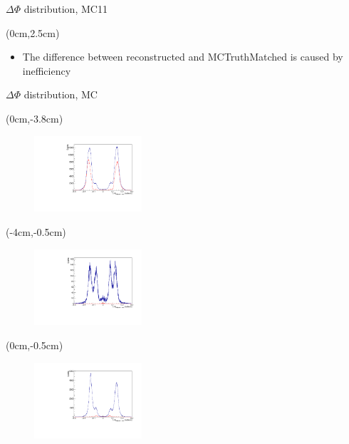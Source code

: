\documentclass[10pt]{beamer}
\begin{document}
{\begin{frame}{$\Delta \Phi$ distribution, MC11}
\begin{textblock*}{0.5\textwidth}
\begin{itemize}
		\end{itemize}
	\end{textblock*}
	
	\begin{textblock*}{\textwidth}(0cm,2.5cm)
	\begin{itemize}
		\item The difference between reconstructed and MCTruthMatched is caused by inefficiency
		
	\end{itemize}
\end{textblock*}
	
\end{frame}




	

\begin{frame}{$\Delta \Phi$ distribution, MC}
	
	\begin{textblock*}{\textwidth}(0cm,-3.8cm)
		\begin{figure}
			\includegraphics[width=4cm]{Plots/isSignalDeltaPhi}
		
		\end{figure}
	\end{textblock*}

\begin{textblock*}{\textwidth}(-4cm,-0.5cm)
	\begin{figure}
		\includegraphics[width=4cm]{Plots/MCgg}
	\end{figure}
	
\end{textblock*}


\begin{textblock*}{\textwidth}(0cm,-0.5cm)
	\begin{figure}
		\includegraphics[width=4cm]{Plots/MCeg}
	\end{figure}
	

\end{textblock*}
\end{frame}}
\end{document}
